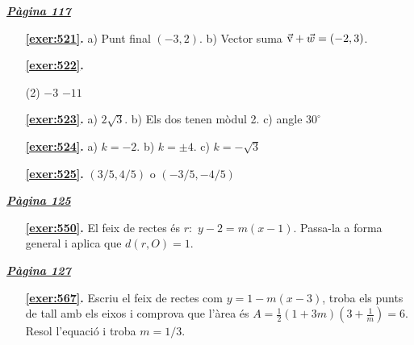 
\hyperlink{page.117}{\textbf{\em Pàgina 117}}
\begin{enumerate}
\item[\fontfamily{phv}\selectfont\color{blue}\textbf{\ref{exer:521}. }] \label{ans:521} 
a) Punt final $(-3,2)$. b) Vector suma $\vec{\mathrm{v}} +\vec w=(-2,3)$.
 \end{enumerate}
\begin{enumerate}



 \item[\fontfamily{phv}\selectfont\color{blue}\textbf{\ref{exer:522}. }] \label{ans:522}
 \begin{tasks}[column-sep=1em, item-indent=1.3333em](2)
	 \task $-3$
	 \task $-11$
\end{tasks}
\item[\fontfamily{phv}\selectfont\color{blue}\textbf{\ref{exer:523}. }] \label{ans:523} 
 a) $2\sqrt {3}$. b) Els dos tenen mòdul 2. c) angle $30^\circ $
\item[\fontfamily{phv}\selectfont\color{blue}\textbf{\ref{exer:524}. }] \label{ans:524} 
a) $k=-2$. b) $k=\pm 4$. c) $k=-\sqrt {3}$
\item[\fontfamily{phv}\selectfont\color{blue}\textbf{\ref{exer:525}. }] \label{ans:525} 
$(3/5, 4/5)$ o $(-3/5, -4/5)$
 \end{enumerate}

 \vspace{1cm} 
 

\vspace{0.3cm}


\hyperlink{page.125}{\textbf{\em Pàgina 125}}
\begin{enumerate}
\item[\fontfamily{phv}\selectfont\color{blue}\textbf{\ref{exer:550}. }] \label{ans:550} 
El feix de rectes és $r:$ $y-2=m(x-1)$. Passa-la a forma general i aplica que $d(r,O)=1$.
 \end{enumerate}
\vspace{0.3cm}


\hyperlink{page.127}{\textbf{\em Pàgina 127}}
\begin{enumerate}
\item[\fontfamily{phv}\selectfont\color{blue}\textbf{\ref{exer:567}. }] \label{ans:567} 
Escriu el feix de rectes com $y=1-m(x-3)$, troba els punts de tall amb els eixos i comprova que l'àrea és $A=\frac {1}{2}(1+3m)(3+\frac {1}{m})=6$. Resol l'equació i troba $m=1/3$.
 \end{enumerate}
\vspace{0.3cm}

